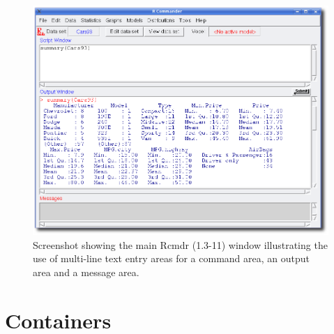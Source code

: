 






\begin{figure}
  \centering
 \includegraphics[width=.8\textwidth]{Rcmdr-main-window}
  \caption{
    Screenshot showing the main Rcmdr (1.3-11) window
    illustrating the use of multi-line text entry areas for a command
    area, an output area and a message area.}
  \label{fig:GUI:R-guis-exs-Rcmdr}
\end{figure}

\section{Containers}
\label{sec:GUI:basic-components-containers}


